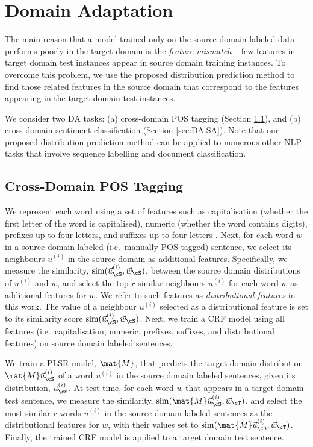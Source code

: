 \documentclass[11pt]{article}
\begin{document}
\section{Domain Adaptation}
\label{sec:DA}

The main reason that a model trained only on the source domain labeled data performs poorly in the target domain
is the \textit{feature mismatch} -- few features in target domain test instances appear
in source domain training instances. To overcome this problem, we use the proposed
distribution prediction method to find those related features in the source domain that
correspond to the features appearing in the target domain test instances. 

We consider two DA tasks: (a) cross-domain POS tagging (Section \ref{sec:DA:POS}), and (b) cross-domain sentiment classification (Section \ref{sec:DA:SA}). 
Note that our proposed distribution prediction method can be applied to  numerous other NLP tasks that  involve sequence labelling and document classification.

\subsection{Cross-Domain POS Tagging}
\label{sec:DA:POS}

We represent each word using a set of features such as capitalisation (whether the first letter of
the word is capitalised), numeric (whether the word contains digits), prefixes up to four letters, 
and suffixes up to four letters \cite{Miller:EMNLP:2011}.
Next, for each word $w$ in a source domain labeled (i.e.\ manually POS tagged) sentence, 
we select its neighbours $u^{(i)}$ in the source domain as additional features.
Specifically, we measure the similarity, ${\rm sim}(\vec{u}^{(i)}_{\cS}, \vec{w}_{\cS})$, between
the source domain distributions of  $u^{(i)}$ and $w$, and select the top $r$ similar neighbours $u^{(i)}$
for each word $w$ as additional features for $w$. We refer to such features as \textit{distributional features} in this work.
The value of a neighbour $u^{(i)}$ selected as a distributional feature is set to
its similarity score ${\rm sim}(\vec{u}^{(i)}_{\cS}, \vec{w}_{\cS})$.
Next, we train a CRF model using all features (i.e.\ capitalisation, numeric, prefixes, suffixes, and
distributional features) on source domain labeled sentences. 

We train a PLSR model, $\mat{M}$, that predicts the target domain distribution $\mat{M}\vec{u}^{(i)}_{\cS}$
of a word $u^{(i)}$ in the source domain labeled sentences, given its distribution, $\vec{u}^{(i)}_{\cS}$.
At test time, for each word $w$ that appears in a target domain test sentence, we measure the similarity,
${\rm sim}(\mat{M}\vec{u}^{(i)}_{\cS}, \vec{w}_{\cT})$, and select the most similar $r$ words $u^{(i)}$
in the source domain labeled sentences as the 
distributional features for $w$, with their values set to ${\rm sim}(\mat{M}\vec{u}^{(i)}_{\cS}, \vec{w}_{\cT})$. 
Finally, the trained CRF model is applied to a target domain test sentence.
\end{document}

